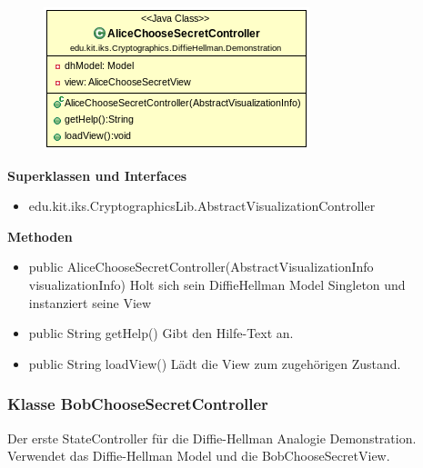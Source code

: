 \documentclass{article}
\begin{document}
      \begin{figure}[H]
        \centering
        \includegraphics[width=\textwidth]{resources/edu-kit-iks-Cryptographics-DiffieHellman-Demonstration-AliceChooseSecretController}
      \end{figure}

      \textbf{Superklassen und Interfaces}
      \begin{itemize}
        \item edu.kit.iks.CryptographicsLib.AbstractVisualizationController
      \end{itemize}

      \textbf{Methoden}
      \begin{itemize}
          \item public AliceChooseSecretController(AbstractVisualizationInfo visualizationInfo) \newline
              Holt sich sein DiffieHellman Model Singleton und instanziert seine View
        \item public String getHelp() \newline
        Gibt den Hilfe-Text an.
        \item public String loadView() \newline
        Lädt die View zum zugehörigen Zustand.
      \end{itemize}

\subsubsection{Klasse BobChooseSecretController}
      Der erste StateController für die Diffie-Hellman Analogie Demonstration.
      Verwendet das Diffie-Hellman Model und die BobChooseSecretView.
\end{document}
